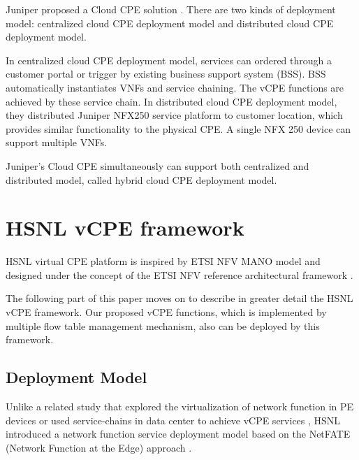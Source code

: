Juniper proposed a Cloud CPE solution \cite{juniper-cpe}. There are two kinds of deployment model: centralized cloud CPE deployment model and distributed cloud CPE deployment model.

In centralized cloud CPE deployment model, services can ordered through a customer portal or trigger by existing business support system (BSS). BSS automatically instantiates VNFs and service chaining. The vCPE functions are achieved by these service chain.
In distributed cloud CPE deployment model, they distributed Juniper NFX250 service platform to customer location, which provides similar functionality to the physical CPE. A single NFX 250 device can support multiple VNFs.

Juniper’s Cloud CPE simultaneously can support both centralized and distributed model, called hybrid cloud CPE deployment model.



\section{HSNL vCPE framework} \label{sec:hsnl_vcpe}


HSNL virtual CPE platform \cite{che-wei-master, che-wei-umedia} is inspired by ETSI NFV MANO model and designed under the concept of the ETSI NFV reference architectural framework \cite{etsi-nfv-archi}.

The following part of this paper moves on to describe in greater detail the HSNL vCPE framework. Our proposed vCPE functions, which is implemented by multiple flow table management mechanism, also can be deployed by this framework.


\subsection{Deployment Model}
Unlike a related study that explored the virtualization of network function in PE devices \cite{vcpe-enhance} or used service-chains in data center to achieve vCPE services \cite{ericsson-vcpe}, HSNL introduced a network function service deployment model based on the NetFATE (Network Function at the Edge) approach \cite{netfate}.

